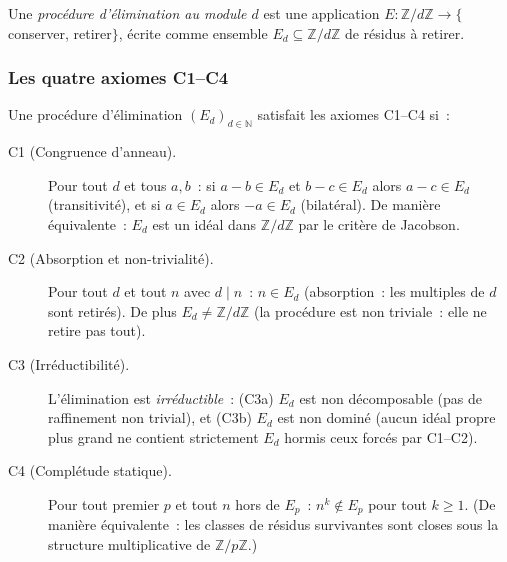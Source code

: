 \documentclass[12pt,a4paper]{article}
\begin{document}
\begin{definition}
Une \emph{procédure d'élimination au module $d$} est une application
$E : \mathbb{Z}/d\mathbb{Z} \to \{$conserver, retirer$\}$, écrite
comme ensemble $E_d \subseteq \mathbb{Z}/d\mathbb{Z}$ de résidus à
retirer.
\end{definition}

\subsubsection{Les quatre axiomes C1--C4}
\label{subsec:C1_C4}

\begin{definition}
\label{def:C1_C4}
Une procédure d'élimination $(E_d)_{d \in \mathbb{N}}$ satisfait les
axiomes C1--C4 si~:

\begin{description}
\item[C1 (Congruence d'anneau).] Pour tout $d$ et tous $a, b$~: si
  $a - b \in E_d$ et $b - c \in E_d$ alors $a - c \in E_d$
  (transitivité), et si $a \in E_d$ alors $-a \in E_d$ (bilatéral).
  De manière équivalente~: $E_d$ est un idéal dans
  $\mathbb{Z}/d\mathbb{Z}$ par le critère de Jacobson.

\item[C2 (Absorption et non-trivialité).] Pour tout $d$ et tout $n$
  avec $d \mid n$~: $n \in E_d$ (absorption~: les multiples de $d$
  sont retirés). De plus $E_d \neq \mathbb{Z}/d\mathbb{Z}$ (la
  procédure est non triviale~: elle ne retire pas tout).

\item[C3 (Irréductibilité).] L'élimination est \emph{irréductible}~:
  (C3a) $E_d$ est non décomposable (pas de raffinement non trivial),
  et (C3b) $E_d$ est non dominé (aucun idéal propre plus grand ne
  contient strictement $E_d$ hormis ceux forcés par C1--C2).

\item[C4 (Complétude statique).] Pour tout premier $p$ et tout $n$
  hors de $E_p$~: $n^k \notin E_p$ pour tout $k \geq 1$. (De manière
  équivalente~: les classes de résidus survivantes sont closes sous
  la structure multiplicative de $\mathbb{Z}/p\mathbb{Z}$.)
\end{description}
\end{definition}
\end{document}
